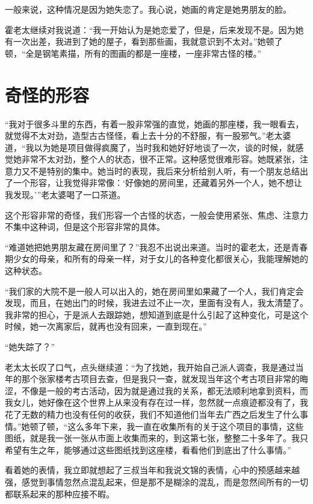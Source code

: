 一般来说，这种情况是因为她失恋了。我心说，她画的肯定是她男朋友的脸。

霍老太继续对我说道：“我一开始认为是她恋爱了，但是，后来发现不是。因为她有一次出差，我进到了她的屋子，看到那些画，我就意识到不太对。”她顿了顿，“全是钢笔素描，所有的图画的都是一座楼，一座非常古怪的楼。”

\chapter{奇怪的形容}

“我对于很多斗里的东西，有着一股非常强的直觉，她画的那座楼，我一眼看去，就觉得不太对劲，造型古古怪怪，看上去十分的不舒服，有一股邪气。”老太婆道，“我以为她是项目做得疯魔了，当时我和她好好地谈了一次，谈的时候，就感觉她非常不太对劲，整个人的状态，很不正常。这种感觉很难形容。她既紧张，注意力又不是特别的集中。她当时的表现，我后来分析给别人听，有一个朋友总结出了一个形容，让我觉得非常像：‘好像她的房间里，还藏着另外一个人，她不想让我发现。’”老太婆喝了一口茶道。

这个形容非常的奇怪，我们形容一个古怪的状态，一般会使用紧张、焦虑、注意力不集中这种词，但是这个形容非常的具体。

“难道她把她男朋友藏在房间里了？”我忍不出说出来道。当时的霍老太，还是青春期少女的母亲，和所有的母亲一样，对于女儿的各种变化都很关心，我能理解她的这种状态。

“我们家的大院不是一般人可以出入的，她在房间里如果藏了一个人，我们肯定会发现，而且，在她出门的时候，我进去过不止一次，里面有没有人，我太清楚了。我非常的担心，于是派人去跟踪她，想知道到底是什么引起了这种变化，可是这个时候，她一次离家后，就再也没有回来，一直到现在。”

“她失踪了？”

老太太长叹了口气，点头继续道：“为了找她，我开始自己派人调查，我是通过当年的那个张家楼考古项目去查，但是我只一查，就发现当年这个考古项目非常的晦涩，不像是一般的考古活动，因为就是通过我的关系，都无法顺利地拿到资料，而我女儿，她好像在这个世界上从来没有存在过一样，忽然就一点痕迹都没有了，我花了无数的精力也没有任何的收获，我们不知道他们当年去广西之后发生了什么事情。”她顿了顿，“这么多年下来，我一直在收集所有的关于这个项目的事情，这些图纸，就是我一张一张从市面上收集而来的，到这第七张，整整二十多年了。我只希望有生之年，能够通过这些图纸找到这座楼，看看他们到底出了什么事情。”

看着她的表情，我立即就想起了三叔当年和我说文锦的表情，心中的预感越来越强，感觉到事情忽然点混乱起来，但是那不是糊涂的混乱，而是忽然间所有的一切都联系起来的那种应接不暇。

